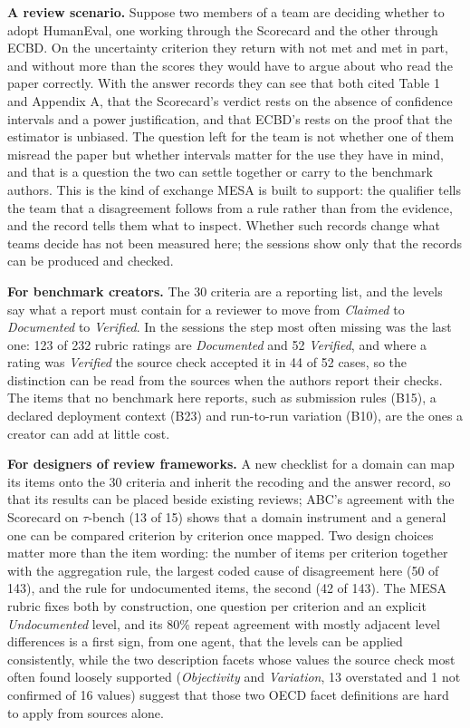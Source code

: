 \documentclass[10pt,conference]{IEEEtran}
\begin{document}
\textbf{A review scenario.} Suppose two members of a team are deciding whether to adopt HumanEval, one working through the Scorecard and the other through ECBD. On the uncertainty criterion they return with not met and met in part, and without more than the scores they would have to argue about who read the paper correctly. With the answer records they can see that both cited Table 1 and Appendix A, that the Scorecard's verdict rests on the absence of confidence intervals and a power justification, and that ECBD's rests on the proof that the estimator is unbiased. The question left for the team is not whether one of them misread the paper but whether intervals matter for the use they have in mind, and that is a question the two can settle together or carry to the benchmark authors. This is the kind of exchange MESA is built to support: the qualifier tells the team that a disagreement follows from a rule rather than from the evidence, and the record tells them what to inspect. Whether such records change what teams decide has not been measured here; the sessions show only that the records can be produced and checked.

\textbf{For benchmark creators.} The 30 criteria are a reporting list, and the levels say what a report must contain for a reviewer to move from \emph{Claimed} to \emph{Documented} to \emph{Verified}. In the sessions the step most often missing was the last one: 123 of 232 rubric ratings are \emph{Documented} and 52 \emph{Verified}, and where a rating was \emph{Verified} the source check accepted it in 44 of 52 cases, so the distinction can be read from the sources when the authors report their checks. The items that no benchmark here reports, such as submission rules (B15), a declared deployment context (B23) and run-to-run variation (B10), are the ones a creator can add at little cost.

\textbf{For designers of review frameworks.} A new checklist for a domain can map its items onto the 30 criteria and inherit the recoding and the answer record, so that its results can be placed beside existing reviews; ABC's agreement with the Scorecard on $\tau$-bench (13 of 15) shows that a domain instrument and a general one can be compared criterion by criterion once mapped. Two design choices matter more than the item wording: the number of items per criterion together with the aggregation rule, the largest coded cause of disagreement here (50 of 143), and the rule for undocumented items, the second (42 of 143). The MESA rubric fixes both by construction, one question per criterion and an explicit \emph{Undocumented} level, and its 80\% repeat agreement with mostly adjacent level differences is a first sign, from one agent, that the levels can be applied consistently, while the two description facets whose values the source check most often found loosely supported (\emph{Objectivity} and \emph{Variation}, 13 overstated and 1 not confirmed of 16 values) suggest that those two OECD facet definitions are hard to apply from sources alone.
\end{document}
